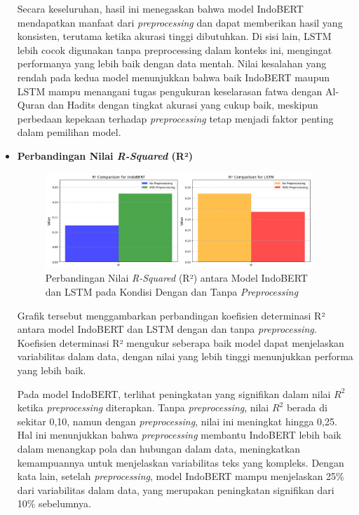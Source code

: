 \documentclass[12pt,a4paper]{article}
\begin{document}
\begin{itemize}
    Secara keseluruhan, hasil ini menegaskan bahwa model IndoBERT mendapatkan manfaat dari \textit{preprocessing} dan dapat memberikan hasil yang konsisten, terutama ketika akurasi tinggi dibutuhkan. Di sisi lain, LSTM lebih cocok digunakan tanpa preprocessing dalam konteks ini, mengingat performanya yang lebih baik dengan data mentah. Nilai kesalahan yang rendah pada kedua model menunjukkan bahwa baik IndoBERT maupun LSTM mampu menangani tugas pengukuran keselarasan fatwa dengan Al-Quran dan Hadits dengan tingkat akurasi yang cukup baik, meskipun perbedaan kepekaan terhadap \textit{preprocessing} tetap menjadi faktor penting dalam pemilihan model.
    
    \item \textbf{Perbandingan Nilai \textit{R-Squared} (R²)}
    \begin{figure}[H]
        \centering
        \includegraphics[width=0.95\textwidth]{images/r2 comparison.png}
        \caption{Perbandingan Nilai \textit{R-Squared} (R²) antara Model IndoBERT dan LSTM pada Kondisi Dengan dan Tanpa \textit{Preprocessing}}
        \label{fig:Perbandingan Nilai R-Squared}
    \end{figure}
    Grafik tersebut menggambarkan perbandingan koefisien determinasi R² antara model IndoBERT dan LSTM dengan dan tanpa \textit{preprocessing}. Koefisien determinasi R² mengukur seberapa baik model dapat menjelaskan variabilitas dalam data, dengan nilai yang lebih tinggi menunjukkan performa yang lebih baik.

   Pada model IndoBERT, terlihat peningkatan yang signifikan dalam nilai $R^2$ ketika \textit{preprocessing} diterapkan. Tanpa \textit{preprocessing}, nilai $R^2$ berada di sekitar 0,10, namun dengan \textit{preprocessing}, nilai ini meningkat hingga 0,25. Hal ini menunjukkan bahwa \textit{preprocessing} membantu IndoBERT lebih baik dalam menangkap pola dan hubungan dalam data, meningkatkan kemampuannya untuk menjelaskan variabilitas teks yang kompleks. Dengan kata lain, setelah \textit{preprocessing}, model IndoBERT mampu menjelaskan 25\% dari variabilitas dalam data, yang merupakan peningkatan signifikan dari 10\% sebelumnya.


\end{itemize}
\end{document}
